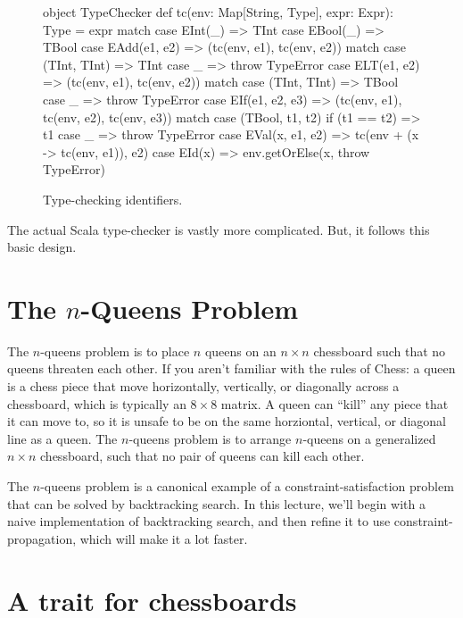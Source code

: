 \documentclass[9pt]{extbook}
\begin{document}
\begin{figure}
\begin{scalacode}
object TypeChecker {
  def tc(env: Map[String, Type], expr: Expr): Type = expr match {
    case EInt(_) => TInt
    case EBool(_) => TBool
    case EAdd(e1, e2) => (tc(env, e1), tc(env, e2)) match {
      case (TInt, TInt) => TInt
      case _ => throw TypeError
    }
    case ELT(e1, e2) => (tc(env, e1), tc(env, e2)) match {
      case (TInt, TInt) => TBool
      case _ => throw TypeError
    }
    case EIf(e1, e2, e3) => (tc(env, e1), tc(env, e2), tc(env, e3)) match {
      case (TBool, t1, t2) if (t1 == t2) => t1
      case _ => throw TypeError
    }
    case EVal(x, e1, e2) => tc(env + (x -> tc(env, e1)), e2)
    case EId(x) => env.getOrElse(x, throw TypeError)
  }
}
\end{scalacode}
\caption{Type-checking identifiers.}\label{tcid}
\end{figure}

The actual Scala type-checker is vastly more complicated. But, it follows
this basic design.



\newlecture

\section{The $n$-Queens Problem}

The $n$-queens problem is to place $n$ queens on an $n \times n$ chessboard
such that no queens threaten each other.
If you aren't familiar with the
rules of Chess: a queen is a chess piece that move horizontally, vertically,
or diagonally across a chessboard, which is typically an $8 \times 8$ matrix.
A queen can ``kill'' any piece that it can move to, so it is unsafe to be
on the same horziontal, vertical, or diagonal line as a queen. The $n$-queens
problem is to arrange $n$-queens on a generalized $n \times n$ chessboard,
such that no pair of queens can kill each other.

The $n$-queens problem is a canonical example of a constraint-satisfaction
problem that can be solved by backtracking search. In this lecture, we'll
begin with a naive implementation of backtracking search, and then refine
it to use constraint-propagation, which will make it a lot faster.

\section{A trait for chessboards}
\end{document}
